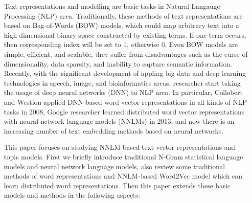 \documentclass[master]{njuthesis}
\begin{document}
\begin{englishabstract}

Text representations and modelling are basic tasks in Natural Langauge Processing (NLP) area. Traditionally, these methods of text representations are based on Bag-of-Words (BOW) models, which could map arbitrary text into a high-dimensional binary space constructed by existing terms. If one term occurs, then corresponding index will be set to 1, otherwise 0. Even BOW models are simple, efficient, and scalable, they suffer from disadvantages such as the curse of dimensionality, data sparsity, and inability to capture semantic information. Recently, with the significant development of appling big data and deep learning technologies in speech, image, and bioinformatics areas, researcher start taking the usage of deep neural networks (DNN) to NLP area. In particular, Collobert and Westion applied DNN-based word vector representations in all kinds of NLP tasks in 2008, Google researcher learned distributed word vector representations with neural network language models (NNLMs) in 2013, and now there is an increasing number of  text embedding methods based on neural networks.

This paper focuses on studying NNLM-based text vector representations and topic models. First we briefly introduce traditional N-Gram statistical language models and neural network language models, also review some traditional methods of word representations and NNLM-based Word2Vec model which can learn distributed word representations. Then this paper extends these basic models and methods in the following aspects:


\end{englishabstract}
\end{document}
